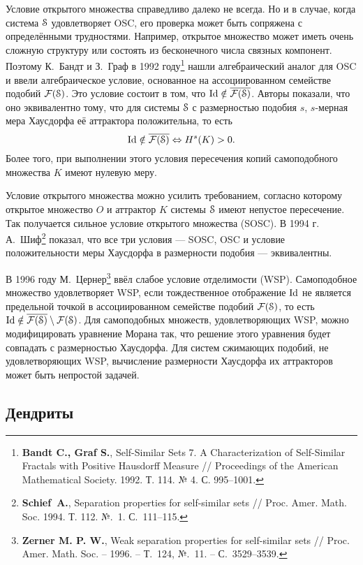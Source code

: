 \documentclass[a5paper,9pt,twoside]{extarticle} %
\begin{document}
Условие открытого множества справедливо далеко не всегда. Но и в случае, когда система ${\EuScript S}$ удовлетворяет OSC, его проверка может быть сопряжена с определёнными трудностями.
Например, открытое множество может иметь очень сложную структуру или состоять из бесконечного числа связных компонент.
Поэтому К.~Бандт и З.~Граф в 1992 году\footnote{{\bf Bandt C., Graf S.}, Self-Similar Sets 7. A Characterization of Self-Similar Fractals with Positive Hausdorff Measure // Proceedings of the American Mathematical Society. 1992. Т. 114. № 4. С. 995--1001.} нашли алгебраический аналог для OSC и ввели алгебраическое условие, основанное на ассоциированном семействе подобий $\mathcal{F}({\EuScript S})$.
Это условие состоит в том, что $\mathop{\rm Id} \nolimits\notin\overline{\mathcal{F}({\EuScript S})}$. Авторы показали, что оно эквивалентно тому, что для системы ${\EuScript S}$ с размерностью подобия $s$, $s$-мерная мера Хаусдорфа её аттрактора положительна, то есть
$$\mathop{\rm Id} \nolimits\notin\overline{\mathcal{F}({\EuScript S})} \Leftrightarrow H^s(K)>0.$$
Более того, при выполнении этого условия пересечения копий самоподобного множества $K$ имеют нулевую меру.

Условие открытого множества можно усилить требованием, согласно которому открытое множество $O$ и аттрактор $K$ системы ${\EuScript S}$ имеют непустое пересечение.
Так получается сильное условие открытого множества (SOSC).
В 1994 г. А.~Шиф\footnote{{\bf Schief~A.}, Separation properties for self-similar sets // Proc. Amer. Math. Soc. 1994. Т. 112. №.~1. С.~111--115.} показал, что все три условия --- SOSC, OSC и условие положительности меры Хаусдорфа в размерности подобия --- эквивалентны.

В 1996 году М.~Цернер\footnote{{\bf Zerner M. P. W.}, Weak separation properties for self-similar sets // Proc. Amer. Math. Soc. -- 1996. -- Т.~124, №.~11. -- С.~3529--3539.} ввёл слабое условие отделимости (WSP).
Самоподобное множество удовлетворяет WSP, если тождественное отображение $\mathop{\rm Id} \nolimits$ не является предельной точкой в ассоциированном семействе подобий $\mathcal{F}({\EuScript S})$, то есть $\mathop{\rm Id} \nolimits\notin\overline{\mathcal{F}({\EuScript S})}\setminus\mathcal{F}({\EuScript S})$.
Для самоподобных множеств, удовлетворяющих WSP, можно модифицировать уравнение Морана так, что решение этого уравнения будет совпадать с размерностью Хаусдорфа.
Для систем сжимающих подобий, не удовлетворяющих WSP, вычисление размерности Хаусдорфа их аттракторов может быть непростой задачей.


\subsection{Дендриты}
\end{document}
